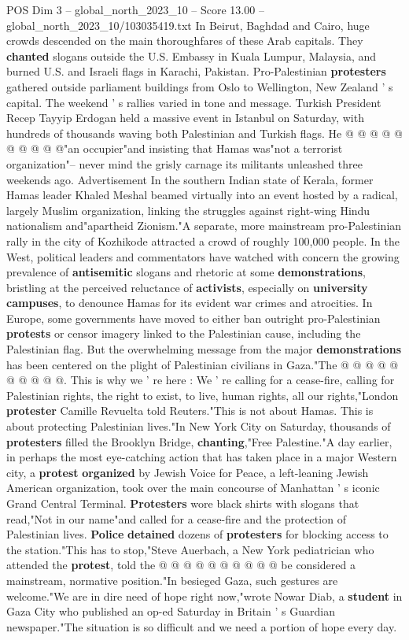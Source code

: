 \begin{textsample}{POS Dim 3 – global\_north\_2023\_10 – Score 13.00 – global\_north\_2023\_10/103035419.txt}
In Beirut, Baghdad and Cairo, huge crowds descended on the main thoroughfares of these Arab capitals.
They \textbf{chanted} slogans outside the U.S.
Embassy in Kuala Lumpur, Malaysia, and burned U.S. and Israeli flags in Karachi, Pakistan.
Pro-Palestinian \textbf{protesters} gathered outside parliament buildings from Oslo to Wellington, New Zealand ' s capital.
The weekend ' s rallies varied in tone and message.
Turkish President Recep Tayyip Erdogan held a massive event in Istanbul on Saturday, with hundreds of thousands waving both Palestinian and Turkish flags.
He @ @ @ @ @ @ @ @ @ @"an occupier"and insisting that Hamas was"not a terrorist organization"-- never mind the grisly carnage its militants unleashed three weekends ago.
Advertisement In the southern Indian state of Kerala, former Hamas leader Khaled Meshal beamed virtually into an event hosted by a radical, largely Muslim organization, linking the struggles against right-wing Hindu nationalism and"apartheid Zionism."A separate, more mainstream pro-Palestinian rally in the city of Kozhikode attracted a crowd of roughly 100,000 people.
In the West, political leaders and commentators have watched with concern the growing prevalence of \textbf{antisemitic} slogans and rhetoric at some \textbf{demonstrations}, bristling at the perceived reluctance of \textbf{activists}, especially on \textbf{university} \textbf{campuses}, to denounce Hamas for its evident war crimes and atrocities.
In Europe, some governments have moved to either ban outright pro-Palestinian \textbf{protests} or censor imagery linked to the Palestinian cause, including the Palestinian flag.
But the overwhelming message from the major \textbf{demonstrations} has been centered on the plight of Palestinian civilians in Gaza."The @ @ @ @ @ @ @ @ @ @.
This is why we ' re here : We ' re calling for a cease-fire, calling for Palestinian rights, the right to exist, to live, human rights, all our rights,"London \textbf{protester} Camille Revuelta told Reuters."This is not about Hamas.
This is about protecting Palestinian lives."In New York City on Saturday, thousands of \textbf{protesters} filled the Brooklyn Bridge, \textbf{chanting},"Free Palestine."A day earlier, in perhaps the most eye-catching action that has taken place in a major Western city, a \textbf{protest} \textbf{organized} by Jewish Voice for Peace, a left-leaning Jewish American organization, took over the main concourse of Manhattan ' s iconic Grand Central Terminal. \textbf{Protesters} wore black shirts with slogans that read,"Not in our name"and called for a cease-fire and the protection of Palestinian lives. \textbf{Police} \textbf{detained} dozens of \textbf{protesters} for blocking access to the station."This has to stop,"Steve Auerbach, a New York pediatrician who attended the \textbf{protest}, told the @ @ @ @ @ @ @ @ @ @ be considered a mainstream, normative position."In besieged Gaza, such gestures are welcome."We are in dire need of hope right now,"wrote Nowar Diab, a \textbf{student} in Gaza City who published an op-ed Saturday in Britain ' s Guardian newspaper."The situation is so difficult and we need a portion of hope every day.

\end{textsample}
